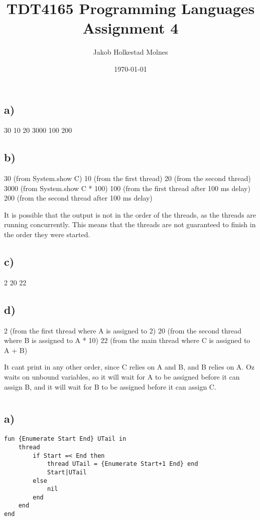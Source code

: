 \documentclass[11pt,a4paper]{report}
\title{TDT4165 Programming Languages Assignment 4}
\author{Jakob Holkestad Molnes}
\date{\today}
\begin{document}
\maketitle

\section{}
\subsection{a)}
30
10
20
3000
100
200
\subsection{b)}
30 (from {System.show C})
10 (from the first thread)
20 (from the second thread)
3000 (from {System.show C * 100})
100 (from the first thread after 100 ms delay)
200 (from the second thread after 100 ms delay)

It is possible that the output is not in the order of the threads, as the threads are running concurrently. This means that the threads are not guaranteed to finish in the order they were started. 

\subsection{c)}
2
20
22
\subsection{d)}
2 (from the first thread where A is assigned to 2)
20 (from the second thread where B is assigned to A * 10)
22 (from the main thread where C is assigned to A + B)

It cant print in any other order, since C relies on A and B, and B relies on A.
Oz waits on unbound variables, so it will wait for A to be assigned before it can assign B, and it will wait for B to be assigned before it can assign C.

\section{}
\subsection{a)}
\begin{lstlisting}[language=Oz]
fun {Enumerate Start End} UTail in
    thread 
        if Start =< End then
            thread UTail = {Enumerate Start+1 End} end
            Start|UTail
        else 
            nil
        end
    end
end
\end{lstlisting}
\end{document}
